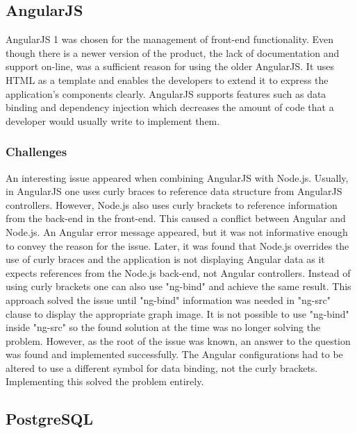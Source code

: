 \documentclass{l4proj}
\begin{document}
\subsection{AngularJS}

AngularJS 1 was chosen for the management of front-end functionality. Even though there is a newer version of the product, the lack of documentation and support on-line, was a sufficient reason for using the older AngularJS. It uses HTML as a template and enables the developers to extend it to express the application's components clearly. AngularJS supports features such as data binding and dependency injection which decreases the amount of code that a developer would usually write to implement them. 

\subsubsection{Challenges}

An interesting issue appeared when combining AngularJS with Node.js. Usually, in AngularJS one uses curly braces to reference data structure from AngularJS controllers. However, Node.js also uses curly brackets to reference information from the back-end in the front-end. This caused a conflict between Angular and Node.js. An Angular error message appeared, but it was not informative enough to convey the reason for the issue. Later, it was found that Node.js overrides the use of curly braces and the application is not displaying Angular data as it expects references from the Node.js back-end, not Angular controllers. Instead of using curly brackets one can also use "ng-bind" and achieve the same result. This approach solved the issue until "ng-bind" information was needed in "ng-src" clause to display the appropriate graph image. It is not possible to use "ng-bind" inside "ng-src" so the found solution at the time was no longer solving the problem. However, as the root of the issue was known, an answer to the question was found and implemented successfully. The Angular configurations had to be altered to use a different symbol for data binding, not the curly brackets. Implementing this solved the problem entirely. 


\subsection{PostgreSQL}
\end{document}
